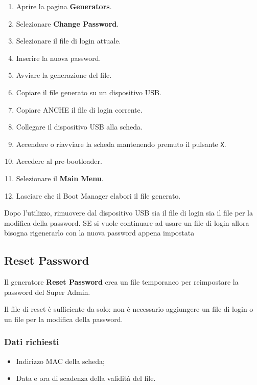 \documentclass[11pt,a4paper]{article}
\newcommand{\button}[1]{\textbf{#1}}
\begin{document}
\begin{enumerate}
    \item Aprire la pagina \button{Generators}.
    \item Selezionare \button{Change Password}.
    \item Selezionare il file di login attuale.
    \item Inserire la nuova password.
    \item Avviare la generazione del file.
    \item Copiare il file generato su un dispositivo USB.
    \item Copiare ANCHE il file di login corrente.
    \item Collegare il dispositivo USB alla scheda.
    \item Accendere o riavviare la scheda mantenendo premuto
    il pulsante \texttt{X}.
    \item Accedere al pre-bootloader.
    \item Selezionare il \textbf{Main Menu}.
    \item Lasciare che il Boot Manager elabori il file generato.
\end{enumerate}

Dopo l'utilizzo, rimuovere dal dispositivo USB sia il file di login
sia il file per la modifica della password. SE si vuole continuare ad usare un file di login
allora bisogna rigenerarlo con la nuova password appena impostata

\subsection{Reset Password}

Il generatore \button{Reset Password} crea un file temporaneo
per reimpostare la password del Super Admin.

Il file di reset è sufficiente da solo: non è necessario aggiungere
un file di login o un file per la modifica della password.

\subsubsection*{Dati richiesti}

\begin{itemize}
    \item Indirizzo MAC della scheda;
    \item Data e ora di scadenza della validità del file.
\end{itemize}
\end{document}
